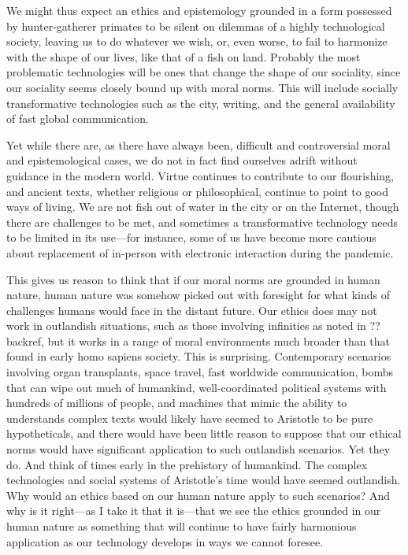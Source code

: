 We might thus expect an ethics and epistemology grounded in a form possessed by hunter-gatherer primates
to be silent on dilemmas of a highly technological society, leaving us to do whatever we wish, or, even worse, 
to fail to harmonize with the shape of our lives, like that of a fish on land. Probably the most problematic
technologies will be ones that change the shape of our sociality, since our sociality seems closely bound
up with moral norms. This will include socially transformative technologies such as the city, writing, and 
the general availability of fast global communication.

Yet while there are, as there have always been, difficult and controversial moral and epistemological cases, 
we do not in fact find ourselves adrift without guidance in the modern world. Virtue continues to contribute 
to our flourishing, and ancient texts, whether religious or philosophical, continue to point to good ways of 
living. We are not fish out of water in the city or on the Internet, though there are challenges to be met,
and sometimes a transformative technology needs to be limited in its use---for instance, some of us have 
become more cautious about replacement of in-person with electronic interaction during the pandemic.

This gives us reason to think that if our moral norms are grounded in human nature, human nature was somehow
picked out with foresight for what kinds of challenges humans would face in the distant future. Our ethics
does may not work in outlandish situations, such as those involving infinities as noted in ??backref, but it works in a
range of moral environments much broader than that found in early homo sapiens society. This is surprising. 
Contemporary scenarios involving organ transplants, space travel, fast worldwide communication, bombs that can wipe out
much of humankind, well-coordinated political systems with hundreds of millions of people, and machines that mimic 
the ability to understands complex texts 
would likely have seemed to Aristotle to be pure hypotheticals, and there would have been little reason to suppose
that our ethical norms would have significant application to such outlandish scenarios. Yet they do. And think of
times early in the prehistory of humankind. The complex technologies and social systems
of Aristotle's time would have seemed outlandish. Why would an ethics based on our human nature apply to such
scenarios? And why is it right---as I take it that it is---that we see the ethics grounded in our human nature 
as something that will continue to have fairly harmonious application as our technology develops in ways we cannot 
foresee. 

